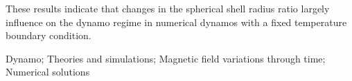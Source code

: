 \documentclass[mreferee]{gji}
\begin{document}
\begin{summary}
{}
These results indicate that changes in the spherical shell radius ratio largely influence on the dynamo regime in numerical dynamos with a fixed temperature boundary condition.
\end{summary}
%
\begin{keywords}
Dynamo; Theories and simulations; Magnetic field variations through time; Numerical solutions
\end{keywords}
%

%

%

%

%

%

%
\end{document}
